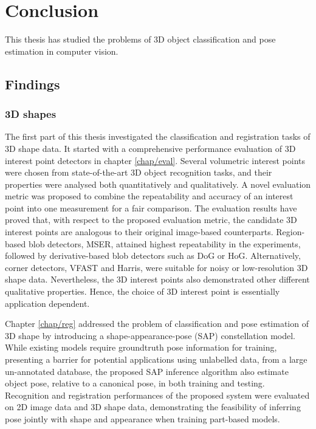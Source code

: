 \chapter{Conclusion}
\label{chap/conclusion}

This thesis has studied the problems of 3D object classification and pose estimation in computer vision. 

\section{Findings}

\subsection{3D shapes}

The first part of this thesis investigated the classification and registration tasks of 3D shape data. It started with a comprehensive performance evaluation of 3D interest point detectors in chapter \ref{chap/eval}. Several volumetric interest points were chosen from state-of-the-art 3D object recognition tasks, and their properties were analysed both quantitatively and qualitatively. 
A novel evaluation metric was proposed to combine the repeatability and accuracy of an interest point into one measurement for a fair comparison.  
The evaluation results have proved that, with respect to the proposed evaluation metric, the candidate 3D interest points are analogous to their original image-based counterparts. Region-based blob detectors, \eg MSER, attained highest repeatability in the experiments, followed by derivative-based blob detectors such as DoG or HoG. Alternatively, corner detectors, \eg VFAST and Harris, were suitable for noisy or low-resolution 3D shape data.  
Nevertheless, the 3D interest points also demonstrated other different qualitative properties. Hence, the choice of 3D interest point is essentially application dependent. 

Chapter \ref{chap/reg} addressed the problem of classification and pose estimation of 3D shape by introducing a shape-appearance-pose (SAP) constellation model. While existing models require groundtruth pose information for training, presenting a barrier for potential applications using unlabelled data, \eg from a large un-annotated database, the proposed SAP inference algorithm also estimate object pose, relative to a canonical pose, in both training and testing.  
Recognition and registration performances of the proposed system were evaluated on 2D image data and 3D shape data, demonstrating the feasibility of inferring pose jointly with shape and appearance when training part-based models. 

